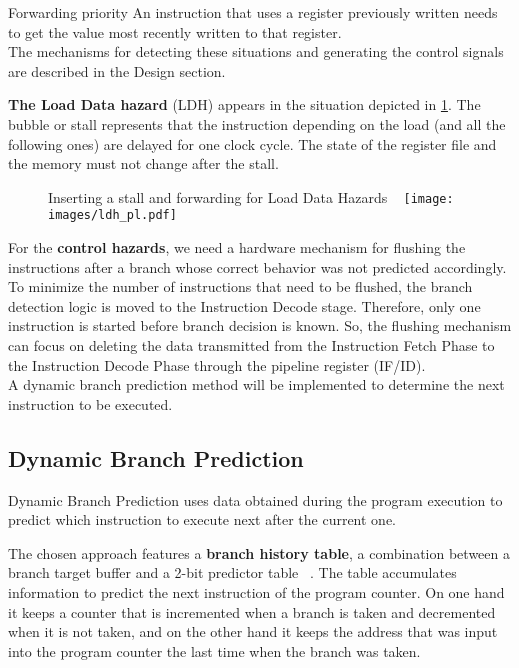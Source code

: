 \documentclass[a4paper,12pt]{report}
\begin{document}
\begin{remark}{Forwarding priority}
     An instruction that uses a register previously written needs to get the value most recently written to that register.\\
     \tcblower
     The mechanisms for detecting these situations and generating the control signals are described in the Design section.\\
\end{remark}

\textbf{The Load Data hazard} (LDH) appears in the situation depicted in \ref{fig:ldh_pl}. The bubble or stall represents that the instruction depending on the load (and all the following ones) are delayed for one clock cycle. The state of the register file and the memory must not change after the stall.

\begin{figure}[h]
\begin{my-figure}{Inserting a stall and forwarding for Load Data Hazards ~\cite{patterson2014computer}}
    \centering
    \texttt{[image: images/ldh\_pl.pdf]}
    \label{fig:ldh_pl}
\end{my-figure}
\end{figure}

For the \textbf{control hazards}, we need a hardware mechanism for flushing the instructions after a branch whose correct behavior was not predicted accordingly. To minimize the number of instructions that need to be flushed, the branch detection logic is moved to the Instruction Decode stage. Therefore, only one instruction is started before branch decision is known. So, the flushing mechanism can focus on deleting the data transmitted from the Instruction Fetch Phase to the Instruction Decode Phase through the pipeline register (IF/ID). \\
A dynamic branch prediction method will be implemented to determine the next instruction to be executed.

\subsection{Dynamic Branch Prediction}
Dynamic Branch Prediction uses data obtained during the program execution to predict which instruction to execute next after the current one. 

The chosen approach features a \textbf{branch history table}, a combination between a branch target buffer and a 2-bit predictor table ~\cite{patterson2014computer}. The table accumulates information to predict the next instruction of the program counter. On one hand it keeps a counter that is incremented when a branch is taken and decremented when it is not taken, and on the other hand it keeps the address that was input into the program counter the last time when the branch was taken.
\end{document}
